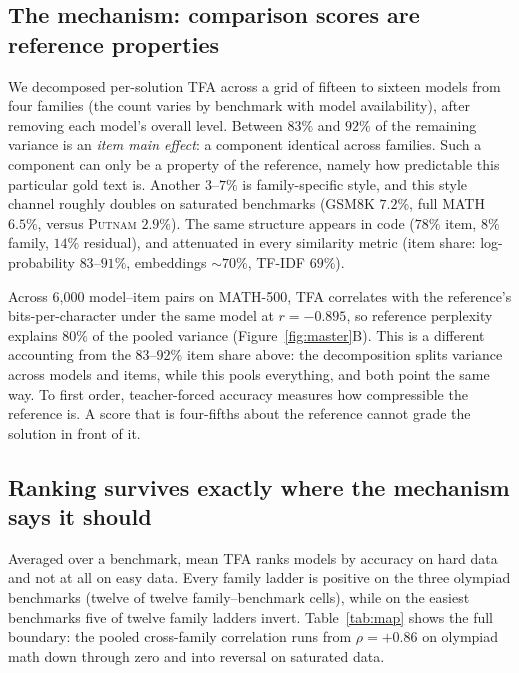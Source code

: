 \documentclass[11pt]{article}
\newcommand{\tfa}{\textsc{TFA}}
\begin{document}
\subsection{The mechanism: comparison scores are reference properties}
\label{sec:mechanism}

We decomposed per-solution \tfa{} across a grid of fifteen to sixteen models from four families (the count varies by benchmark with model availability), after removing each model's overall level.
Between $83\%$ and $92\%$ of the remaining variance is an \emph{item main effect}: a component identical across families.
Such a component can only be a property of the reference, namely how predictable this particular gold text is.
Another $3$--$7\%$ is family-specific style, and this style channel roughly doubles on saturated benchmarks (\textsc{GSM8K} $7.2\%$, full \textsc{MATH} $6.5\%$, versus \textsc{Putnam} $2.9\%$).
The same structure appears in code ($78\%$ item, $8\%$ family, $14\%$ residual), and attenuated in every similarity metric (item share: log-probability $83$--$91\%$, embeddings ${\sim}70\%$, TF-IDF $69\%$).

Across 6{,}000 model--item pairs on \textsc{MATH-500}, \tfa{} correlates with the reference's bits-per-character under the same model at $r = -0.895$, so reference perplexity explains $80\%$ of the pooled variance (Figure~\ref{fig:master}B).
This is a different accounting from the $83$--$92\%$ item share above: the decomposition splits variance across models and items, while this pools everything, and both point the same way.
To first order, teacher-forced accuracy measures how compressible the reference is.
A score that is four-fifths about the reference cannot grade the solution in front of it.

\subsection{Ranking survives exactly where the mechanism says it should}
\label{sec:ranking}

Averaged over a benchmark, mean \tfa{} ranks models by accuracy on hard data and not at all on easy data.
Every family ladder is positive on the three olympiad benchmarks (twelve of twelve family--benchmark cells), while on the easiest benchmarks five of twelve family ladders invert.
Table~\ref{tab:map} shows the full boundary: the pooled cross-family correlation runs from $\rho = +0.86$ on olympiad math down through zero and into reversal on saturated data.
\end{document}
